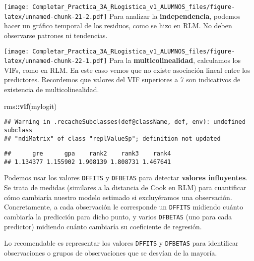 \documentclass[
]{article}
\newenvironment{Shaded}{\begin{snugshade}}{\end{snugshade}}
\newcommand{\FunctionTok}[1]{\textcolor[rgb]{0.13,0.29,0.53}{\textbf{#1}}}
\newcommand{\NormalTok}[1]{#1}
\newcommand{\SpecialCharTok}[1]{\textcolor[rgb]{0.81,0.36,0.00}{\textbf{#1}}}
\begin{document}
\texttt{[image: Completar\_Practica\_3A\_RLogistica\_v1\_ALUMNOS\_files/figure-latex/unnamed-chunk-21-2.pdf]}
Para analizar la \textbf{independencia}, podemos hacer un gráfico
temporal de los residuos, como se hizo en RLM. No deben observarse
patrones ni tendencias.

\begin{Shaded}
\end{Shaded}

\texttt{[image: Completar\_Practica\_3A\_RLogistica\_v1\_ALUMNOS\_files/figure-latex/unnamed-chunk-22-1.pdf]}
Para la \textbf{multicolinealidad}, calculamos los VIFs, como en RLM. En
este caso vemos que no existe asociación lineal entre los predictores.
Recordemos que valores del VIF superiores a 7 son indicativos de
existencia de multicolinealidad.

\begin{Shaded}
\begin{Highlighting}[]
\NormalTok{rms}\SpecialCharTok{::}\FunctionTok{vif}\NormalTok{(mylogit)}
\end{Highlighting}
\end{Shaded}

\begin{verbatim}
## Warning in .recacheSubclasses(def@className, def, env): undefined subclass
## "ndiMatrix" of class "replValueSp"; definition not updated
\end{verbatim}

\begin{verbatim}
##      gre      gpa    rank2    rank3    rank4 
## 1.134377 1.155902 1.908139 1.808731 1.467641
\end{verbatim}

Podemos usar los valores \texttt{DFFITS} y \texttt{DFBETAS} para
detectar \textbf{valores influyentes}. Se trata de medidas (similares a
la distancia de Cook en RLM) para cuantificar cómo cambiaría nuestro
modelo estimado si excluyéramos una observación. Concretamente, a cada
observación le corresponde un \texttt{DFFITS} midiendo cuánto cambiaría
la predicción para dicho punto, y varios \texttt{DFBETAS} (uno para cada
predictor) midiendo cuánto cambiaría su coeficiente de regresión.

Lo recomendable es representar los valores \texttt{DFFITS} y
\texttt{DFBETAS} para identificar observaciones o grupos de
observaciones que se desvían de la mayoría.
\end{document}
